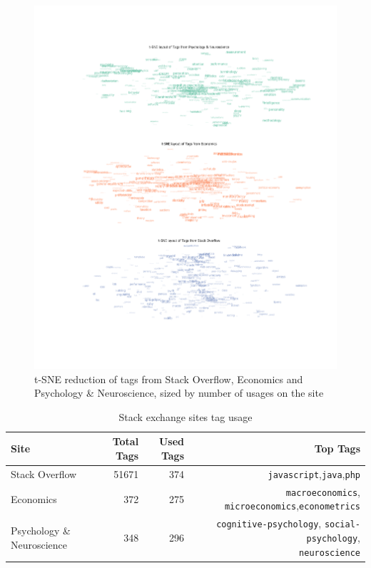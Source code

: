 \documentclass[12pt, a4paper]{article}
\begin{document}
\begin{figure}[H]
	\centering
	\begin{adjustbox}{center}
		\includegraphics[height=1.1\textheight]{tsne_indv}
	\end{adjustbox}
	\caption{t-SNE reduction of tags from Stack Overflow, Economics and Psychology \& Neuroscience, sized by number of usages on the site}\label{tsne_indv}
\end{figure}

\begin{table}[ht]
	\centering
	\begin{adjustbox}{center}
		\begin{tabular}{lrrr}
			\toprule
			Site &  Total Tags &   Used Tags & Top Tags\\
			\midrule
			Stack Overflow &51671&374& \texttt{javascript},\texttt{java},\texttt{php}\\
			Economics &372&275&\texttt{macroeconomics}, \texttt{microeconomics},\texttt{econometrics}\\
			Psychology \& Neuroscience&348&296& \pbox{20cm}{\RaggedLeft\texttt{cognitive-psychology}, \texttt{social-psychology},\\ \texttt{neuroscience}}\\
			\bottomrule
		\end{tabular}
	\end{adjustbox}
	\caption{Stack exchange sites tag usage}\label{tags}
\end{table}
\end{document}
